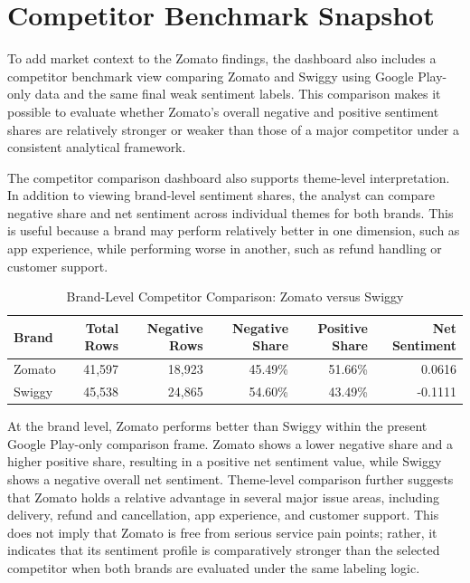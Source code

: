 \section{Competitor Benchmark Snapshot}

To add market context to the Zomato findings, the dashboard also includes a competitor benchmark view comparing Zomato and Swiggy using Google Play-only data and the same final weak sentiment labels. This comparison makes it possible to evaluate whether Zomato's overall negative and positive sentiment shares are relatively stronger or weaker than those of a major competitor under a consistent analytical framework.

The competitor comparison dashboard also supports theme-level interpretation. In addition to viewing brand-level sentiment shares, the analyst can compare negative share and net sentiment across individual themes for both brands. This is useful because a brand may perform relatively better in one dimension, such as app experience, while performing worse in another, such as refund handling or customer support.

\begin{table}[h]
\centering
\caption{Brand-Level Competitor Comparison: Zomato versus Swiggy}
\begin{tabular}{lrrrrr}
\toprule
\textbf{Brand} & \textbf{Total Rows} & \textbf{Negative Rows} & \textbf{Negative Share} & \textbf{Positive Share} & \textbf{Net Sentiment} \\
\midrule
Zomato & 41,597 & 18,923 & 45.49\% & 51.66\% & 0.0616 \\
Swiggy & 45,538 & 24,865 & 54.60\% & 43.49\% & -0.1111 \\
\bottomrule
\end{tabular}
\end{table}

At the brand level, Zomato performs better than Swiggy within the present Google Play-only comparison frame. Zomato shows a lower negative share and a higher positive share, resulting in a positive net sentiment value, while Swiggy shows a negative overall net sentiment. Theme-level comparison further suggests that Zomato holds a relative advantage in several major issue areas, including delivery, refund and cancellation, app experience, and customer support. This does not imply that Zomato is free from serious service pain points; rather, it indicates that its sentiment profile is comparatively stronger than the selected competitor when both brands are evaluated under the same labeling logic.

